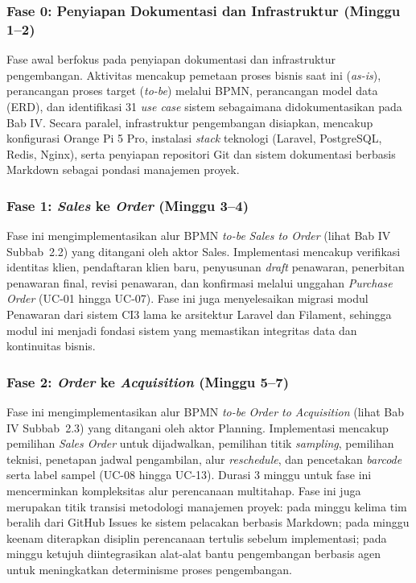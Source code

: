 \subsubsection{Fase 0: Penyiapan Dokumentasi dan Infrastruktur (Minggu 1–2)}

Fase awal berfokus pada penyiapan dokumentasi dan infrastruktur pengembangan. Aktivitas mencakup pemetaan proses bisnis saat ini (\textit{as-is}), perancangan proses target (\textit{to-be}) melalui BPMN, perancangan model data (ERD), dan identifikasi 31 \textit{use case} sistem sebagaimana didokumentasikan pada Bab IV. Secara paralel, infrastruktur pengembangan disiapkan, mencakup konfigurasi Orange Pi 5 Pro, instalasi \textit{stack} teknologi (Laravel, PostgreSQL, Redis, Nginx), serta penyiapan repositori Git dan sistem dokumentasi berbasis Markdown sebagai pondasi manajemen proyek.

\subsubsection{Fase 1: \textit{Sales} ke \textit{Order} (Minggu 3–4)}

Fase ini mengimplementasikan alur BPMN \textit{to-be} \textit{Sales to Order} (lihat Bab IV Subbab~2.2) yang ditangani oleh aktor Sales. Implementasi mencakup verifikasi identitas klien, pendaftaran klien baru, penyusunan \textit{draft} penawaran, penerbitan penawaran final, revisi penawaran, dan konfirmasi melalui unggahan \textit{Purchase Order} (UC-01 hingga UC-07). Fase ini juga menyelesaikan migrasi modul Penawaran dari sistem CI3 lama ke arsitektur Laravel dan Filament, sehingga modul ini menjadi fondasi sistem yang memastikan integritas data dan kontinuitas bisnis.

\subsubsection{Fase 2: \textit{Order} ke \textit{Acquisition} (Minggu 5–7)}

Fase ini mengimplementasikan alur BPMN \textit{to-be} \textit{Order to Acquisition} (lihat Bab IV Subbab~2.3) yang ditangani oleh aktor Planning. Implementasi mencakup pemilihan \textit{Sales Order} untuk dijadwalkan, pemilihan titik \textit{sampling}, pemilihan teknisi, penetapan jadwal pengambilan, alur \textit{reschedule}, dan pencetakan \textit{barcode} serta label sampel (UC-08 hingga UC-13). Durasi 3 minggu untuk fase ini mencerminkan kompleksitas alur perencanaan multitahap. Fase ini juga merupakan titik transisi metodologi manajemen proyek: pada minggu kelima tim beralih dari GitHub Issues ke sistem pelacakan berbasis Markdown; pada minggu keenam diterapkan disiplin perencanaan tertulis sebelum implementasi; pada minggu ketujuh diintegrasikan alat-alat bantu pengembangan berbasis agen untuk meningkatkan determinisme proses pengembangan.

